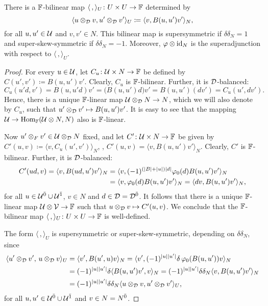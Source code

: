 \begin{lemma}\label{lemma:the-same-vphi}
    There is a $\mathbb{F}$-bilinear map $\langle \, , \rangle_U \colon U\times U \to \mathbb{F}$ determined by 
    \[
        \langle u \otimes_{\mathcal{D}} v , u' \otimes_{\mathcal{D}} v' \rangle_U \coloneqq \langle v , B(u, u') v' \rangle_N,
    \]
    for all $u, u'\in \mathcal U$ and $v, v' \in N$. 
    This bilinear map is supersymmetric if $\delta \delta_N =1$ and super-skew-symmetric if $\delta \delta_N = -1$. 
    Moreover, $\varphi \otimes \operatorname{id}_N$ is the superadjunction with respect to $\langle \, , \rangle_U$. 
\end{lemma}

\begin{proof}
    For every $u\in \mathcal U$, let $C_u \colon \mathcal U \times N \to \mathbb{F}$ be defined by $C(u', v') \coloneqq B(u, u') v'$. 
    Clearly, $C_u$ is $\mathbb{F}$-bilinear. 
    Further, it is $\mathcal{D}$-balanced:
    \[
        C_u(u'd, v') = B(u,u'd)v' = \big( B(u,u')d \big)v' = B(u, u') (d v') = C_u(u', dv').
    \]
    Hence, there is a unique $\mathbb{F}$-linear map $\mathcal U \otimes_{\mathcal{D}} N \to N$, which we will also denote by $C_u$, such that $u' \otimes_{\mathcal{D}} v' \mapsto B(u, u')v'$. 
    It is easy to see that the mapping $\mathcal U \to \operatorname{Hom}_{\mathbb{F}}(\mathcal U \otimes N, N)$ also is $\mathbb{F}$-linear. 
    
    Now $u'\otimes_F v' \in \mathcal U \otimes_{\mathcal{D}} N$ fixed, and let $C'\colon \mathcal U\times N \to \mathbb{F}$ be given by $C'(u,v) \coloneqq \langle v, C_u(u',v') \rangle_N$, \ie, $C'(u,v) = \langle v, B(u, u')v' \rangle_N$. 
    Clearly, $C'$ is $\mathbb{F}$-bilinear. 
    Further, it is $\mathcal{D}$-balanced:
    \begin{align}
        C'(ud,v) = \langle v, B(ud, u')v' \rangle_N &= \langle v, (-1)^{(|B| + |u|)|d|} \varphi_0(d) B(u, u')v' \rangle_N \\
        &= \langle v, \varphi_0(d) B(u, u')v' \rangle_N = \langle d v, B(u, u')v' \rangle_N,
    \end{align}
    for all $u \in \mathcal U^{\bar0} \cup \mathcal U^{\bar1}$, $v\in N$ and $d \in \mathcal{D} = \mathcal{D}^{\bar0}$.
    It follows that there is a unique $\mathbb{F}$-linear map $\mathcal U \otimes \mathcal V \to \mathbb{F}$ such that $u\otimes_{\mathcal{D}} v \mapsto C' (u,v)$. 
    We conclude that the $\mathbb{F}$-bilinear map $\langle \, , \rangle_U \colon U\times U \to \mathbb{F}$ is well-defined. 
    
    The form $\langle \, , \rangle_U$ is supersymmetric or super-skew-symmetric, depending on $\delta \delta_N$, since
    \begin{align}
        \langle u' \otimes_{\mathcal{D}} v' ,\,  u \otimes_{\mathcal{D}} v \rangle_U 
        &= \langle v' , B(u', u) v \rangle_N 
        = \langle v' , (-1)^{|u||u'|}\delta\, \varphi_0( B(u, u') ) v \rangle_N \\
        &= (-1)^{|u||u'|}\delta \langle B(u, u') v' , v \rangle_N 
        = (-1)^{|u||u'|} \delta \delta_N \langle v, B(u, u') v' \rangle_N \\
        &= (-1)^{|u||u'|} \delta \delta_N \langle u \otimes_{\mathcal{D}} v , u' \otimes_{\mathcal{D}} v' \rangle_U, 
    \end{align}
    for all $u, u' \in \mathcal U^{\bar0} \cup \mathcal U^{\bar1}$ and $v \in N = N^{\bar0}$.
    

\end{proof}
